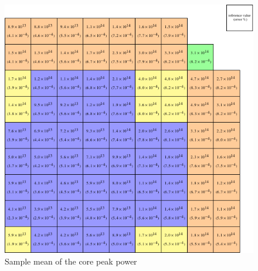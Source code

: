 \documentclass[review,number,sort&compress,12pt]{elsarticle}
\begin{document}
\begin{figure}[H]
	\centering
	\includegraphics[scale=1]{../figures/LRA_power_mean_err.pdf}
	\caption{Sample mean of the core peak power}
	\label{fig:peak power mean error}
\end{figure}
\end{document}
